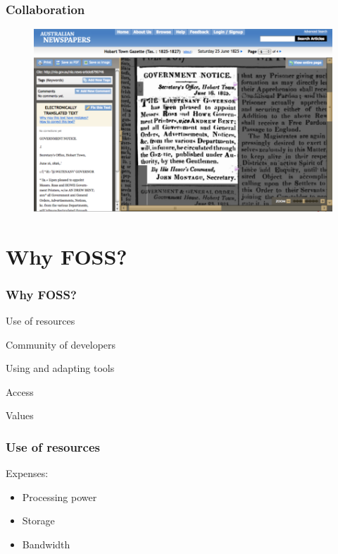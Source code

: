 \documentclass[ignorenonframetext,11pt]{beamer}
\begin{document}
\begin{frame}
\frametitle{Collaboration}
\label{collaboration}

\begin{figure}
	\label{hobarttowngazette}
	\begin{center}
	\includegraphics[keepaspectratio,width=\textwidth, height=.75\textheight]{images/htg.png}
	\end{center}
	\end{figure}
	



\end{frame}
		

\section{Why FOSS?}
\label{whyfoss}

\begin{frame}
\frametitle{Why FOSS?}
\label{whyfoss}

Use of resources


Community of developers


Using and adapting tools


Access


Values



\end{frame}
		

\begin{frame}
\frametitle{Use of resources}
\label{useofresources}

Expenses:


\begin{itemize}


\item Processing power

\item Storage

\item Bandwidth
\end{itemize}


\end{frame}
		
\end{document}
